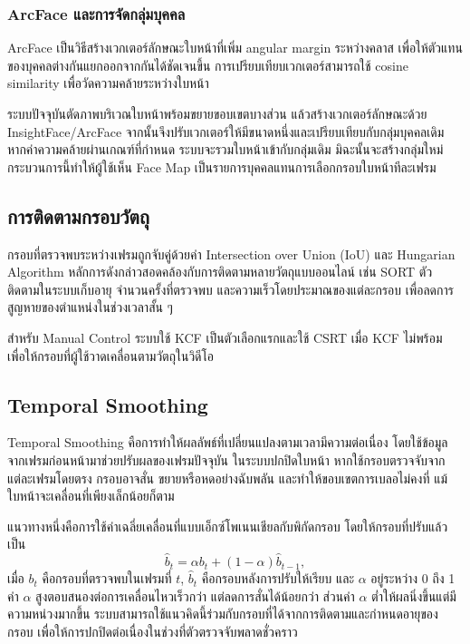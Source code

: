 \subsubsection{ArcFace และการจัดกลุ่มบุคคล}

ArcFace เป็นวิธีสร้างเวกเตอร์ลักษณะใบหน้าที่เพิ่ม angular margin ระหว่างคลาส เพื่อให้ตัวแทนของบุคคลต่างกันแยกออกจากกันได้ชัดเจนขึ้น การเปรียบเทียบเวกเตอร์สามารถใช้ cosine similarity เพื่อวัดความคล้ายระหว่างใบหน้า \cite{deng2019arcface}

ระบบปัจจุบันตัดภาพบริเวณใบหน้าพร้อมขยายขอบเขตบางส่วน แล้วสร้างเวกเตอร์ลักษณะด้วย InsightFace/ArcFace จากนั้นจึงปรับเวกเตอร์ให้มีขนาดหนึ่งและเปรียบเทียบกับกลุ่มบุคคลเดิม หากค่าความคล้ายผ่านเกณฑ์ที่กำหนด ระบบจะรวมใบหน้าเข้ากับกลุ่มเดิม มิฉะนั้นจะสร้างกลุ่มใหม่ กระบวนการนี้ทำให้ผู้ใช้เห็น Face Map เป็นรายการบุคคลแทนการเลือกกรอบใบหน้าทีละเฟรม

\subsection{การติดตามกรอบวัตถุ}

กรอบที่ตรวจพบระหว่างเฟรมถูกจับคู่ด้วยค่า Intersection over Union (IoU) และ Hungarian Algorithm หลักการดังกล่าวสอดคล้องกับการติดตามหลายวัตถุแบบออนไลน์ เช่น SORT ตัวติดตามในระบบเก็บอายุ จำนวนครั้งที่ตรวจพบ และความเร็วโดยประมาณของแต่ละกรอบ เพื่อลดการสูญหายของตำแหน่งในช่วงเวลาสั้น ๆ \cite{bewley2016sort}

สำหรับ Manual Control ระบบใช้ KCF เป็นตัวเลือกแรกและใช้ CSRT เมื่อ KCF ไม่พร้อม เพื่อให้กรอบที่ผู้ใช้วาดเคลื่อนตามวัตถุในวิดีโอ

\subsection{Temporal Smoothing}

Temporal Smoothing คือการทำให้ผลลัพธ์ที่เปลี่ยนแปลงตามเวลามีความต่อเนื่อง โดยใช้ข้อมูลจากเฟรมก่อนหน้ามาช่วยปรับผลของเฟรมปัจจุบัน ในระบบปกปิดใบหน้า หากใช้กรอบตรวจจับจากแต่ละเฟรมโดยตรง กรอบอาจสั่น ขยายหรือหดอย่างฉับพลัน และทำให้ขอบเขตการเบลอไม่คงที่ แม้ใบหน้าจะเคลื่อนที่เพียงเล็กน้อยก็ตาม \cite{nist_smoothing}

แนวทางหนึ่งคือการใช้ค่าเฉลี่ยเคลื่อนที่แบบเอ็กซ์โพเนนเชียลกับพิกัดกรอบ โดยให้กรอบที่ปรับแล้วเป็น
\begin{equation}
\hat{b}_{t}=\alpha b_{t}+(1-\alpha)\hat{b}_{t-1},
\end{equation}
เมื่อ $b_t$ คือกรอบที่ตรวจพบในเฟรมที่ $t$, $\hat{b}_t$ คือกรอบหลังการปรับให้เรียบ และ $\alpha$ อยู่ระหว่าง 0 ถึง 1 ค่า $\alpha$ สูงตอบสนองต่อการเคลื่อนไหวเร็วกว่า แต่ลดการสั่นได้น้อยกว่า ส่วนค่า $\alpha$ ต่ำให้ผลนิ่งขึ้นแต่มีความหน่วงมากขึ้น ระบบสามารถใช้แนวคิดนี้ร่วมกับกรอบที่ได้จากการติดตามและกำหนดอายุของกรอบ เพื่อให้การปกปิดต่อเนื่องในช่วงที่ตัวตรวจจับพลาดชั่วคราว

